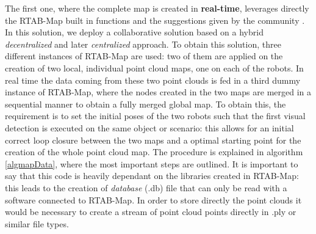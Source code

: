 The first one, where the complete map is created in \textbf{real-time}, leverages directly the RTAB-Map built in functions and the suggestions given by the community \cite{rtabmapforum}. In this solution, we deploy a collaborative solution based on a hybrid \textit{decentralized} and later \textit{centralized} approach. To obtain this solution, three different instances of RTAB-Map are used: two of them are applied on the creation of two local, individual point cloud maps, one on each of the robots. In real time the data coming from these two point clouds is fed in a third dummy instance of RTAB-Map, where the nodes created in the two maps are merged in a sequential manner to obtain a fully merged global map. To obtain this, the requirement is to set the initial poses of the two robots such that the first visual detection is executed on the same object or scenario: this allows for an initial correct loop closure between the two maps and a optimal starting point for the creation of the whole point cloud map. The procedure is explained in algorithm \ref{algmapData}, where the most important steps are outlined. It is important to say that this code is heavily dependant on the libraries created in RTAB-Map: this leads to the creation of \textit{database} (.db) file that can only be read with a software connected to RTAB-Map. In order to store directly the point clouds it would be necessary to create a stream of point cloud points directly in .ply or similar file types.

